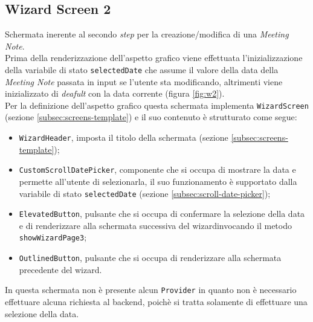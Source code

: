 \subsection{Wizard Screen 2}
\label{subsec:wizard-screen-2}


Schermata inerente al secondo \emph{step} per la creazione/modifica di una \emph{Meeting Note}. \\
Prima della renderizzazione dell'aspetto grafico viene effettuata l'inizializzazione della variabile di stato \lstinline{selectedDate} che assume il valore della data della \emph{Meeting Note} passata in input se l'utente sta modificando, altrimenti viene inizializzato di \emph{deafult} con la data corrente (figura \ref{fig:w2}). \\
Per la definizione dell'aspetto grafico questa schermata implementa \lstinline{WizardScreen} (sezione \ref{subsec:screens-template}) e il suo contenuto è strutturato come segue:
\begin{itemize}
    \item \lstinline{WizardHeader}, imposta il titolo della schermata (sezione \ref{subsec:screens-template});
    \item \lstinline{CustomScrollDatePicker}, componente che si occupa di mostrare la data e permette all'utente di selezionarla, il suo funzionamento è supportato dalla variabile di stato \lstinline{selectedDate} (sezione \ref{subsec:scroll-date-picker});
    \item \lstinline{ElevatedButton}\cite{site:elevated-button}, pulsante che si occupa di confermare la selezione della data e di renderizzare alla schermata successiva del \gls{wizard}\glsoccur invocando il metodo \lstinline{showWizardPage3};
    \item \lstinline{OutlinedButton}\cite{site:outline-button}, pulsante che si occupa di renderizzare alla schermata precedente del \gls{wizard}\glsoccur.
\end{itemize}
In questa schermata non è presente alcun \lstinline{Provider} in quanto non è necessario effettuare alcuna richiesta al \gls{backend}\glsoccur, poichè si tratta solamente di effettuare una selezione della data.

